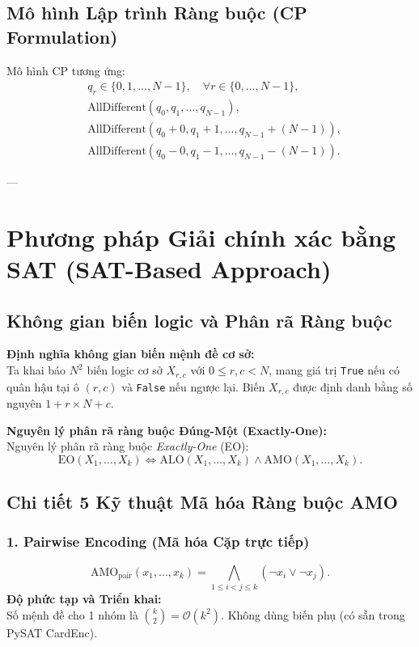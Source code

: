 \documentclass[11pt,a4paper]{article}
\begin{document}
\subsection{Mô hình Lập trình Ràng buộc (CP Formulation)}
Mô hình CP tương ứng:
\begin{align}
    &q_r \in \{0, 1, \dots, N-1\}, \quad \forall r \in \{0, \dots, N-1\}, \\
    &\text{AllDifferent}(q_0, q_1, \dots, q_{N-1}), \label{eq:cp-col}\\
    &\text{AllDifferent}(q_0 + 0, q_1 + 1, \dots, q_{N-1} + (N-1)), \label{eq:cp-diag1}\\
    &\text{AllDifferent}(q_0 - 0, q_1 - 1, \dots, q_{N-1} - (N-1)). \label{eq:cp-diag2}
\end{align}

---

\section{Phương pháp Giải chính xác bằng SAT (SAT-Based Approach)}

\subsection{Không gian biến logic và Phân rã Ràng buộc}

\noindent\textbf{Định nghĩa không gian biến mệnh đề cơ sở:}\\
Ta khai báo $N^2$ biến logic cơ sở $X_{r,c}$ với $0 \le r, c < N$, mang giá trị \texttt{True} nếu có quân hậu tại ô $(r, c)$ và \texttt{False} nếu ngược lại. Biến $X_{r,c}$ được định danh bằng số nguyên $1 + r \times N + c$.

\noindent\textbf{Nguyên lý phân rã ràng buộc Đúng-Một (Exactly-One):}\\
Nguyên lý phân rã ràng buộc \textit{Exactly-One} (EO):
\begin{equation}
    \text{EO}(X_1, \dots, X_k) \iff \text{ALO}(X_1, \dots, X_k) \land \text{AMO}(X_1, \dots, X_k).
\end{equation}

\subsection{Chi tiết 5 Kỹ thuật Mã hóa Ràng buộc AMO}
\subsubsection{1. Pairwise Encoding (Mã hóa Cặp trực tiếp)}
\begin{equation}
    \text{AMO}_{\text{pair}}(x_1, \dots, x_k) = \bigwedge_{1 \le i < j \le k} (\neg x_i \lor \neg x_j).
\end{equation}
\textbf{Độ phức tạp và Triển khai:}\\
Số mệnh đề cho 1 nhóm là $\binom{k}{2} = \mathcal{O}(k^2)$. Không dùng biến phụ (có sẵn trong PySAT CardEnc).
\end{document}

